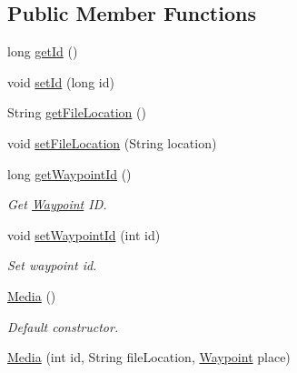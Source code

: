 \subsection*{Public Member Functions}
\begin{DoxyCompactItemize}
\item 
long \hyperlink{classuk_1_1ac_1_1swan_1_1digitaltrails_1_1components_1_1_media_a95632e30057629d0e9ff6e613d03613e}{get\+Id} ()
\item 
void \hyperlink{classuk_1_1ac_1_1swan_1_1digitaltrails_1_1components_1_1_media_ab475679e1c23df3d3aa9a2ee48ee6514}{set\+Id} (long id)
\item 
String \hyperlink{classuk_1_1ac_1_1swan_1_1digitaltrails_1_1components_1_1_media_aa70b54f1d49c650b167f8fc30a7dc833}{get\+File\+Location} ()
\item 
void \hyperlink{classuk_1_1ac_1_1swan_1_1digitaltrails_1_1components_1_1_media_a0b20b6b4f2e330aee183de9f1fe97593}{set\+File\+Location} (String location)
\item 
long \hyperlink{classuk_1_1ac_1_1swan_1_1digitaltrails_1_1components_1_1_media_a95a49f9832d71c14aa469975d90960fb}{get\+Waypoint\+Id} ()
\begin{DoxyCompactList}\small\item\em Get \hyperlink{classuk_1_1ac_1_1swan_1_1digitaltrails_1_1components_1_1_waypoint}{Waypoint} I\+D. \end{DoxyCompactList}\item 
void \hyperlink{classuk_1_1ac_1_1swan_1_1digitaltrails_1_1components_1_1_media_a0d7aa06e45bc7f3286a1152def061a97}{set\+Waypoint\+Id} (int id)
\begin{DoxyCompactList}\small\item\em Set waypoint id. \end{DoxyCompactList}\item 
\hyperlink{classuk_1_1ac_1_1swan_1_1digitaltrails_1_1components_1_1_media_afaba3be6d020574ade908798fe5e4583}{Media} ()
\begin{DoxyCompactList}\small\item\em Default constructor. \end{DoxyCompactList}\item 
\hyperlink{classuk_1_1ac_1_1swan_1_1digitaltrails_1_1components_1_1_media_ad70a21065e0fd9fc33f9993e059ce634}{Media} (int id, String file\+Location, \hyperlink{classuk_1_1ac_1_1swan_1_1digitaltrails_1_1components_1_1_waypoint}{Waypoint} place)
\end{DoxyCompactItemize}
